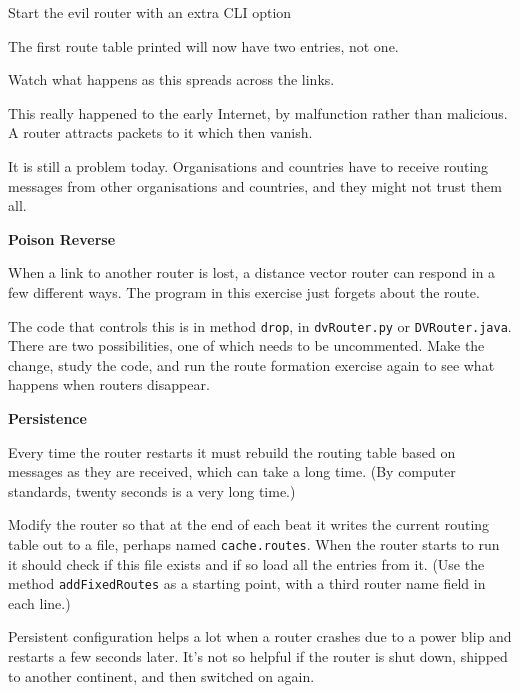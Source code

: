 Start the evil router with an extra CLI option


The first route table printed will now have two entries, not one.

Watch what happens as this spreads across the links.

\begin{IMPORTANT}
This really happened to the early Internet, by malfunction rather
than malicious. A  router attracts packets to it
which then vanish.

It is still a problem today. Organisations and
countries have to receive routing messages from other organisations
and countries, and they might not trust them all.
\end{IMPORTANT}




\textbf{Poison Reverse}

When a link to another router is lost, a distance vector router
can respond in a few different ways. The program in this exercise
just forgets about the route.

The code that controls this is in
method \texttt{drop}, in \texttt{dvRouter.py} or \texttt{DVRouter.java}.
There are two possibilities,
one of which needs to be uncommented. Make the change, study
the code, and run the route formation exercise again to see
what happens when routers disappear.


\textbf{Persistence}

Every time the router restarts it must rebuild the routing table
based on messages as they are received, which can take a long time.
(By computer standards, twenty seconds is a very long time.)

Modify the router so that at the end of
each beat it writes the current routing table out to a file,
perhaps named \texttt{cache.routes}. When the router starts to
run it should check if this file exists and if so load all the
entries from it. (Use the method \texttt{addFixedRoutes} as a
starting point, with a third router name field in each line.)

Persistent configuration helps a lot when a router crashes due
to a power blip and restarts a few seconds later. It's not so
helpful if the router is shut down, shipped to another continent,
and then switched on again.


\COPYRIGHT


